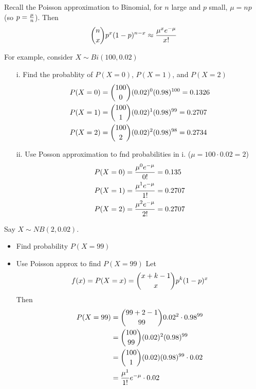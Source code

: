 \documentclass[english, 11pt]{article}
\begin{document}
  Recall the Poisson approximation to Binomial, for $n$ large and $p$ small, $\mu = np$ (so $p = \frac{\mu}{n}$). Then
  \[ {n \choose x} p^x(1-p)^{n-x} \approx  \frac{\mu^x e^{-\mu}}{x!}\]
  \begin{exmp}
    For example, consider $X \sim Bi(100,0.02)$
    \begin{itemize}
      \item[i.] Find the probablity of $P(X = 0)$, $P(X=1)$, and $P(X=2)$ \\
      \begin{align*}
        P(X = 0) & = {100 \choose 0}(0.02)^0(0.98)^{100} = 0.1326 \\
        P(X = 1) & = {100 \choose 1}(0.02)^1(0.98)^{99} = 0.2707 \\
        P(X = 2) & = {100 \choose 2}(0.02)^2(0.98)^{98} = 0.2734
      \end{align*}
      \item[ii.] Use Posson approximation to fnd probabilities in i. ($\mu = 100 \cdot 0.02 = 2$)
      \begin{align*}
        P(X = 0) & = \frac{\mu^0e^{-\mu}}{0!} = 0.135 \\
        P(X = 1) & = \frac{\mu^1e^{-\mu}}{1!} = 0.2707 \\
        P(X = 2) & = \frac{\mu^2e^{-\mu}}{2!} = 0.2707
      \end{align*}
    \end{itemize}
  \end{exmp}

  \begin{exmp}
    Say $X \sim NB(2,0.02)$.
    \begin{itemize}
      \item Find probability $P(X = 99)$ \\
      \item Use Poisson approx to find $P(X = 99)$
      Let
      \[ f(x) = P(X = x) = {x+k-1 \choose x} p^k (1-p)^x\]
      Then
      \begin{align*}
        P(X = 99) & = {99 + 2 - 1 \choose 99} 0.02^2 \cdot 0.98^{99} \\
        & = {100 \choose 99}(0.02)^2 (0.98)^{99} \\
        & = {100 \choose 1} (0.02)(0.98)^{99} \cdot 0.02 \\
        & = \frac{\mu^1}{1!}e^{-\mu} \cdot 0.02
      \end{align*}
    \end{itemize}
  \end{exmp}
\end{document}
